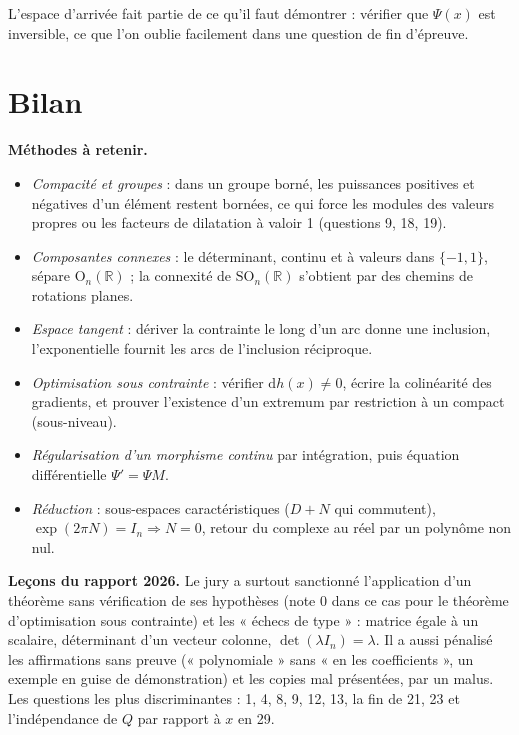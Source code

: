 \documentclass[11pt,a4paper]{article}
\providecommand{\tightlist}{\setlength{\itemsep}{0pt}\setlength{\parskip}{0pt}}
\begin{document}
\begin{piege}

L'espace d'arrivée fait partie de ce qu'il faut démontrer : vérifier que \(\Psi(x)\) est inversible, ce que l'on oublie facilement dans une question de fin d'épreuve.

\end{piege}

\hypertarget{bilan}{%
\section{Bilan}\label{bilan}}

\textbf{Méthodes à retenir.}

\begin{itemize}
\tightlist
\item
  \emph{Compacité et groupes} : dans un groupe borné, les puissances positives et négatives d'un élément restent bornées, ce qui force les modules des valeurs propres ou les facteurs de dilatation à valoir 1 (questions 9, 18, 19).
\item
  \emph{Composantes connexes} : le déterminant, continu et à valeurs dans \(\{-1,1\}\), sépare \({\mathrm{O}}_n(\mathbb{R})\) ; la connexité de \({\mathrm{SO}}_n(\mathbb{R})\) s'obtient par des chemins de rotations planes.
\item
  \emph{Espace tangent} : dériver la contrainte le long d'un arc donne une inclusion, l'exponentielle fournit les arcs de l'inclusion réciproque.
\item
  \emph{Optimisation sous contrainte} : vérifier \(\mathrm{d}h(x)\neq0\), écrire la colinéarité des gradients, et prouver l'existence d'un extremum par restriction à un compact (sous-niveau).
\item
  \emph{Régularisation d'un morphisme continu} par intégration, puis équation différentielle \(\Psi'=\Psi M\).
\item
  \emph{Réduction} : sous-espaces caractéristiques (\(D+N\) qui commutent), \(\exp(2\pi N)=I_n\Rightarrow N=0\), retour du complexe au réel par un polynôme non nul.
\end{itemize}

\textbf{Leçons du rapport 2026.} Le jury a surtout sanctionné l'application d'un théorème sans vérification de ses hypothèses (note 0 dans ce cas pour le théorème d'optimisation sous contrainte) et les « échecs de type » : matrice égale à un scalaire, déterminant d'un vecteur colonne, \(\det(\lambda I_n)=\lambda\). Il a aussi pénalisé les affirmations sans preuve (« polynomiale » sans « en les coefficients », un exemple en guise de démonstration) et les copies mal présentées, par un malus. Les questions les plus discriminantes : 1, 4, 8, 9, 12, 13, la fin de 21, 23 et l'indépendance de \(Q\) par rapport à \(x\) en 29.
\end{document}

